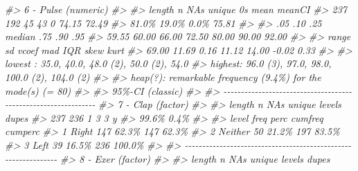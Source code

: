 \documentclass[
]{book}
\newenvironment{Shaded}{\begin{snugshade}}{\end{snugshade}}
\newcommand{\CommentTok}[1]{\textcolor[rgb]{0.56,0.35,0.01}{\textit{#1}}}
\begin{document}
\begin{Shaded}
\begin{Highlighting}[]
\CommentTok{\#\textgreater{} 6 {-} Pulse (numeric)}
\CommentTok{\#\textgreater{} }
\CommentTok{\#\textgreater{}   length      n    NAs  unique     0s   mean  meanCI\textquotesingle{}}
\CommentTok{\#\textgreater{}      237    192     45      43      0  74.15   72.49}
\CommentTok{\#\textgreater{}           81.0\%  19.0\%           0.0\%          75.81}
\CommentTok{\#\textgreater{}                                                     }
\CommentTok{\#\textgreater{}      .05    .10    .25  median    .75    .90     .95}
\CommentTok{\#\textgreater{}    59.55  60.00  66.00   72.50  80.00  90.00   92.00}
\CommentTok{\#\textgreater{}                                                     }
\CommentTok{\#\textgreater{}    range     sd  vcoef     mad    IQR   skew    kurt}
\CommentTok{\#\textgreater{}    69.00  11.69   0.16   11.12  14.00  {-}0.02    0.33}
\CommentTok{\#\textgreater{}                                                     }
\CommentTok{\#\textgreater{} lowest : 35.0, 40.0, 48.0 (2), 50.0 (2), 54.0}
\CommentTok{\#\textgreater{} highest: 96.0 (3), 97.0, 98.0, 100.0 (2), 104.0 (2)}
\CommentTok{\#\textgreater{} }
\CommentTok{\#\textgreater{} heap(?): remarkable frequency (9.4\%) for the mode(s) (= 80)}
\CommentTok{\#\textgreater{} }
\CommentTok{\#\textgreater{} \textquotesingle{} 95\%{-}CI (classic)}
\CommentTok{\#\textgreater{} }
\CommentTok{\#\textgreater{} {-}{-}{-}{-}{-}{-}{-}{-}{-}{-}{-}{-}{-}{-}{-}{-}{-}{-}{-}{-}{-}{-}{-}{-}{-}{-}{-}{-}{-}{-}{-}{-}{-}{-}{-}{-}{-}{-}{-}{-}{-}{-}{-}{-}{-}{-}{-}{-}{-}{-}{-}{-}{-}{-}{-}{-}{-}{-}{-}{-}{-}{-}{-} }
\CommentTok{\#\textgreater{} 7 {-} Clap (factor)}
\CommentTok{\#\textgreater{} }
\CommentTok{\#\textgreater{}   length      n    NAs unique levels  dupes}
\CommentTok{\#\textgreater{}      237    236      1      3      3      y}
\CommentTok{\#\textgreater{}           99.6\%   0.4\%                     }
\CommentTok{\#\textgreater{} }
\CommentTok{\#\textgreater{}      level  freq   perc  cumfreq  cumperc}
\CommentTok{\#\textgreater{} 1    Right   147  62.3\%      147    62.3\%}
\CommentTok{\#\textgreater{} 2  Neither    50  21.2\%      197    83.5\%}
\CommentTok{\#\textgreater{} 3     Left    39  16.5\%      236   100.0\%}
\CommentTok{\#\textgreater{} }
\CommentTok{\#\textgreater{} {-}{-}{-}{-}{-}{-}{-}{-}{-}{-}{-}{-}{-}{-}{-}{-}{-}{-}{-}{-}{-}{-}{-}{-}{-}{-}{-}{-}{-}{-}{-}{-}{-}{-}{-}{-}{-}{-}{-}{-}{-}{-}{-}{-}{-}{-}{-}{-}{-}{-}{-}{-}{-}{-}{-}{-}{-}{-}{-}{-}{-}{-}{-} }
\CommentTok{\#\textgreater{} 8 {-} Exer (factor)}
\CommentTok{\#\textgreater{} }
\CommentTok{\#\textgreater{}   length      n    NAs unique levels  dupes}

\end{Highlighting}
\end{Shaded}
\end{document}
